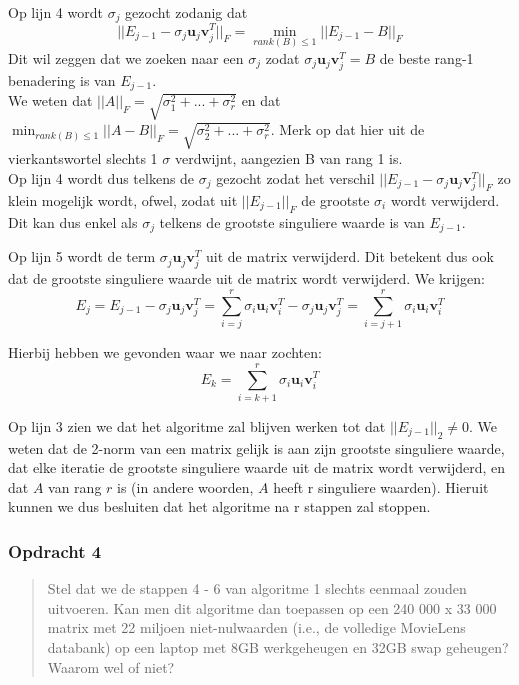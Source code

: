 \documentclass[11pt, a4paper, titlepage, openright]{article}
\begin{document}
    Op lijn 4 wordt \( \sigma_j \) gezocht zodanig dat
    \[ || E_{j-1} - \sigma_j \textbf{u}_j \textbf{v}_j^T ||_F = \min_{rank(B) \leq 1} || E_{j-1} - B ||_F \]
    Dit wil zeggen dat we zoeken naar een \( \sigma_j \) zodat
    \( \sigma_j \textbf{u}_j \textbf{v}_j^T = B \) de beste rang-1 benadering is van \( E_{j-1} \). \\
    We weten dat \( || A ||_F = \sqrt{ \sigma_1^2 + ... + \sigma_r^2 } \) en dat
    \( \min_{rank(B) \leq 1 } || A - B ||_F = \sqrt{ \sigma_{2}^2 + ... + \sigma_r^2 } \). Merk op dat hier uit
    de vierkantswortel slechts 1 \( \sigma \) verdwijnt, aangezien B van rang 1 is. \\
    Op lijn 4 wordt dus telkens de \( \sigma_j \) gezocht zodat het verschil \( ||E_{j-1} - \sigma_j \textbf{u}_j \textbf{v}_j^T ||_F \)
    zo klein mogelijk wordt, ofwel, zodat uit \( || E_{j-1} ||_F\) de grootste \( \sigma_i \) wordt verwijderd.
    Dit kan dus enkel als \( \sigma_j \) telkens de grootste singuliere waarde is van \( E_{j-1} \).
    \bigskip

    Op lijn 5 wordt de term \( \sigma_j \textbf{u}_j \textbf{v}_j^T \) uit de matrix verwijderd. Dit betekent
    dus ook dat de grootste singuliere waarde uit de matrix wordt verwijderd. We krijgen:
    \[ E_j = E_{j-1} - \sigma_j \textbf{u}_j \textbf{v}_j^T
           = \sum\limits_{i=j}^{r} \sigma_i \textbf{u}_i \textbf{v}_i^T - \sigma_j \textbf{u}_j \textbf{v}_j^T
           = \sum\limits_{i=j+1}^{r} \sigma_i \textbf{u}_i \textbf{v}_i^T \]

    Hierbij hebben we gevonden waar we naar zochten:
    \[ E_k = \sum\limits_{i=k+1}^{r} \sigma_i \textbf{u}_i \textbf{v}_i^T \]

    \bigskip

    Op lijn 3 zien we dat het algoritme zal blijven werken tot dat \( || E_{j-1} ||_2 \ne 0 \). We weten dat
    de 2-norm van een matrix gelijk is aan zijn grootste singuliere waarde, dat elke iteratie de grootste singuliere
    waarde uit de matrix wordt verwijderd, en dat \(A\) van rang \(r\) is (in andere woorden, \(A\) heeft r singuliere waarden).
    Hieruit kunnen we dus besluiten dat het algoritme na r stappen zal stoppen.

	\subsubsection{Opdracht 4}
    \begin{quote}
        Stel dat we de stappen 4 - 6 van algoritme 1 slechts eenmaal zouden uitvoeren.
        Kan men dit algoritme dan toepassen op een 240 000 x 33 000 matrix met 22 miljoen niet-nulwaarden
        (i.e., de volledige MovieLens databank) op een laptop met 8GB werkgeheugen en 32GB swap geheugen? Waarom wel of niet?
    \end{quote}
\end{document}
